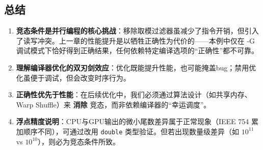 \subsection{总结}
\begin{enumerate}
    \item \textbf{竞态条件是并行编程的核心挑战}：移除取模过滤器虽减少了指令开销，但引入了读写冲突。上一章的性能提升是以牺牲正确性为代价的——本例中仅在 -G 调试模式下恰好得到正确结果，任何依赖特定编译选项的“正确性”都不可靠。
    \item \textbf{理解编译器优化的双刃剑效应}：优化既能提升性能，也可能掩盖bug；禁用优化虽便于调试，但会改变时序行为。
    \item \textbf{正确性优先于性能}：在后续优化中，我们必须通过算法设计（如共享内存、Warp Shuffle）来 \textbf{消除} 竞态，而非依赖编译器的“幸运调度”。
    \item \textbf{浮点精度说明}：CPU与GPU输出的微小尾数差异属于正常现象（IEEE 754 累加顺序不同），可通过改用 \lstinline{double} 类型验证。但若出现数量级差异（如 $10^{11}$ vs $10^{10}$），则必为竞态条件所致。
\end{enumerate}

